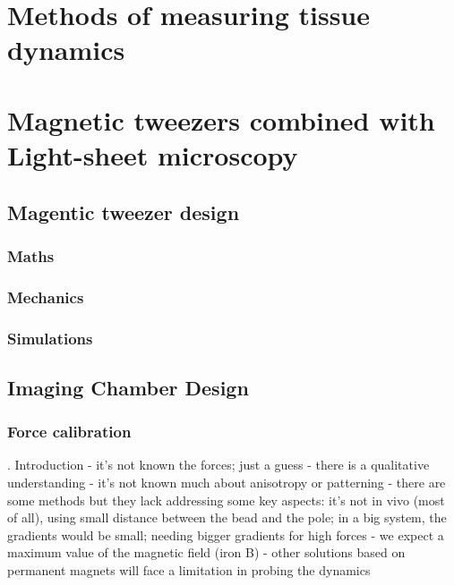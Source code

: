 \section{Methods of measuring tissue dynamics}
\section{Magnetic tweezers combined with Light-sheet microscopy}
\subsection{Magentic tweezer design}
\subsubsection{Maths}
\subsubsection{Mechanics}
\subsubsection{Simulations}
\subsection{Imaging Chamber Design}
\subsubsection{Force calibration}
  . Introduction
    - it’s not known the forces; just a guess
    - there is a qualitative understanding
    - it’s not known much about anisotropy or patterning
    - there are some methods but they lack addressing some key aspects: it’s not in vivo (most of all), using small distance between the bead and the pole; in a big system, the gradients would be small; needing bigger gradients for high forces
    - we expect a maximum value of the magnetic field (iron B)
    - other solutions based on permanent magnets will face a limitation in probing the dynamics

